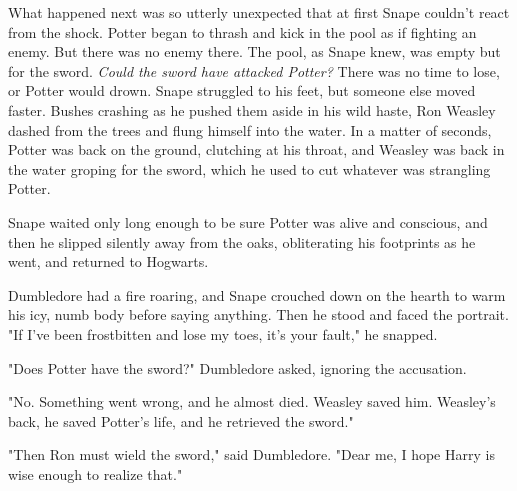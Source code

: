 \documentclass[a4paper,11pt]{article}
\begin{document}
What happened next was so utterly unexpected that at first Snape couldn't react from the shock. Potter began to thrash and kick in the pool as if fighting an enemy. But there was no enemy there. The pool, as Snape knew, was empty but for the sword. \emph{Could the sword have attacked Potter?} There was no time to lose, or Potter would drown. Snape struggled to his feet, but someone else moved faster. Bushes crashing as he pushed them aside in his wild haste, Ron Weasley dashed from the trees and flung himself into the water. In a matter of seconds, Potter was back on the ground, clutching at his throat, and Weasley was back in the water groping for the sword, which he used to cut whatever was strangling Potter.

Snape waited only long enough to be sure Potter was alive and conscious, and then he slipped silently away from the oaks, obliterating his footprints as he went, and returned to Hogwarts.

Dumbledore had a fire roaring, and Snape crouched down on the hearth to warm his icy, numb body before saying anything. Then he stood and faced the portrait. "If I've been frostbitten and lose my toes, it's your fault," he snapped.

"Does Potter have the sword?" Dumbledore asked, ignoring the accusation.

"No. Something went wrong, and he almost died. Weasley saved him. Weasley's back, he saved Potter's life, and he retrieved the sword."

"Then Ron must wield the sword," said Dumbledore. "Dear me, I hope Harry is wise enough to realize that."
\end{document}
